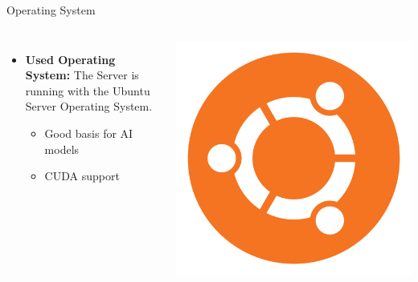 \documentclass{beamer}
\begin{document}
\begin{frame}{Operating System}
  \begin{columns}
      \begin{itemize}
        \item \textbf{Used Operating System:} The Server is running with the Ubuntu Server Operating System. 
        \begin{itemize}
          \item Good basis for AI models
          \item CUDA support
        \end{itemize}
      \end{itemize}
      \includegraphics[width=\textwidth]{Ubuntu.png}
  \end{columns}

\end{frame}
\end{document}
